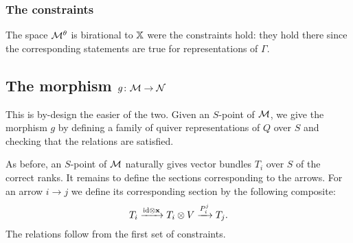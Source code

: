 \documentclass{amsart}
\theoremstyle{definition}
\begin{document}
\subsubsection{The constraints}

The space $\mathcal{M}^\theta$ is birational to $\mathbb{X}$ were the constraints hold: they hold there since the corresponding statements are true for representations of $\Gamma$.

\subsection{The morphism $g \colon \mathcal{M} \rightarrow \mathcal{N}$}

This is by-design the easier of the two.
Given an $S$-point of $\mathcal{M}$, we give the morphism $g$ by defining a family of quiver representations of $Q$ over $S$ and checking that the relations are satisfied.

As before, an $S$-point of $\mathcal{M}$ naturally gives vector bundles $T_i$ over $S$ of the correct ranks.
It remains to define the sections corresponding to the arrows.
For an arrow $i \rightarrow j$ we define its corresponding section by the following composite:
$$T_i \xrightarrow{\text{id} \otimes \mathbf{x}} T_i \otimes V \xrightarrow{P_i^j} T_j.$$
The relations follow from the first set of constraints.



\end{document}
